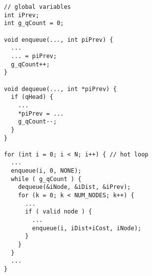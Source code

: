 \begin{lstlisting}[morekeywords={iPrev,piPrev,g_qCount},belowskip=0pt]
// global variables
int iPrev;
int g_qCount = 0;

void enqueue(..., int piPrev) {
  ...
  ... = piPrev;
  g_qCount++;
}

void dequeue(..., int *piPrev) {
  if (qHead) {
    ...
    *piPrev = ...
    g_qCount--;
  }
}

for (int i = 0; i < N; i++) { // hot loop
  ...
  enqueue(i, 0, NONE);
  while ( g_qCount ) {
    dequeue(&iNode, &iDist, &iPrev);
    for (k = 0; k < NUM_NODES; k++) {
      ...
      if ( valid node ) {
        ...
        enqueue(i, iDist+iCost, iNode);
      }
    }
  }
  ...
}

\end{lstlisting}
